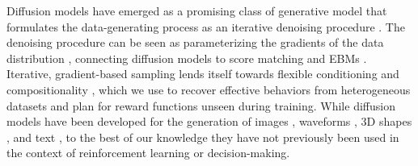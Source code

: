 
Diffusion models have emerged as a promising class of generative model that formulates the data-generating process as an iterative denoising procedure \citep{sohldickstein2015nonequilibrium, ho2020denoising}.
The denoising procedure can be seen as parameterizing the gradients of the data distribution \citep{song2019generative}, connecting diffusion models to score matching \cite{hyvarinen2005score} and EBMs \citep{lecun06atutorial, du2019implicit, nijkamp2019learning,grathwohl2020stein}.
Iterative, gradient-based sampling lends itself towards flexible conditioning \citep{dhariwal2021diffusion} and compositionality \citep{du2020compositional}, which we use to recover effective behaviors from heterogeneous datasets and plan for reward functions unseen during training.
While diffusion models have been developed for the generation of images \cite{song2020denoising}, waveforms \cite{chen2020wavegrad}, 3D shapes \cite{zhou2021shape}, and text \cite{austin2021structured}, to the best of our knowledge they have not previously been used in the context of reinforcement learning or decision-making.